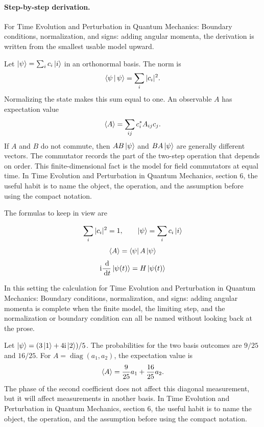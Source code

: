 \paragraph{Step-by-step derivation.}

For Time Evolution and Perturbation in Quantum Mechanics: Boundary conditions, normalization, and signs: adding angular momenta, the derivation is written from the smallest usable model upward.

Let \(\left|\psi\right\rangle=\sum_i c_i\left|i\right\rangle\) in an orthonormal basis.  The norm is
\[
  \left\langle \psi\,\middle|\,\psi\right\rangle=\sum_i |c_i|^2.
\]
Normalizing the state makes this sum equal to one.  An observable \(A\) has expectation value
\[
  \left\langle A\right\rangle=\sum_{ij}c_i^*A_{ij}c_j.
\]
If \(A\) and \(B\) do not commute, then \(AB\left|\psi\right\rangle\) and \(BA\left|\psi\right\rangle\) are generally different vectors.  The commutator records the part of the two-step operation that depends on order.  This finite-dimensional fact is the model for field commutators at equal time.  In Time Evolution and Perturbation in Quantum Mechanics, section 6, the useful habit is to name the object, the operation, and the assumption before using the compact notation.

The formulas to keep in view are

\[
  \sum_i |c_i|^2=1,\qquad \left|\psi\right\rangle=\sum_i c_i\left|i\right\rangle
\]
\[
  \left\langle A\right\rangle=\left\langle \psi\right|A\left|\psi\right\rangle
\]
\[
  \mathrm i\frac{\,\mathrm d}{\,\mathrm d t}\left|\psi(t)\right\rangle=H\left|\psi(t)\right\rangle
\]

In this setting the calculation for Time Evolution and Perturbation in Quantum Mechanics: Boundary conditions, normalization, and signs: adding angular momenta is complete when the finite model, the limiting step, and the normalization or boundary condition can all be named without looking back at the prose.




\begin{example}
Let \(\left|\psi\right\rangle=(3\left|1\right\rangle+4\mathrm i\left|2\right\rangle)/5\).  The probabilities for the two basis outcomes are \(9/25\) and \(16/25\).  For \(A=\operatorname{diag}(a_1,a_2)\), the expectation value is
\[
  \left\langle A\right\rangle=\frac{9}{25}a_1+\frac{16}{25}a_2.
\]
The phase of the second coefficient does not affect this diagonal measurement, but it will affect measurements in another basis.  In Time Evolution and Perturbation in Quantum Mechanics, section 6, the useful habit is to name the object, the operation, and the assumption before using the compact notation.
\end{example}



